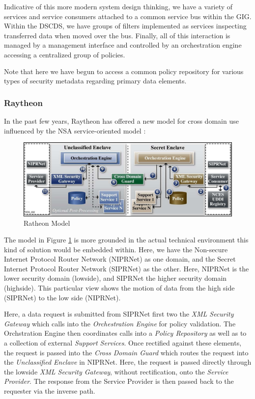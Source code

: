 \documentclass[12pt,letterpaper]{article}
\begin{document}
Indicative of this more modern system design thinking, we have a variety of services and service consumers attached to a common service bus within the GIG.  Within the DSCDS, we have groups of filters implemented as services inspecting transferred data when moved over the bus.  Finally, all of this interaction is managed by a management interface and controlled by an orchestration engine accessing a centralized group of policies.

Note that here we have begun to access a common policy repository for various types of security metadata regarding primary data elements.

\subsubsection{Raytheon}
In the past few years, Raytheon has offered a new model for cross domain use influenced by the NSA service-oriented model \cite{proposal:raytheon-arch}:

\begin{figure}[!t]
\centering
\includegraphics[width=5in]{raytheon-arch}
\caption{Ratheon Model}
\label{fig:model:conceptual-model-ray}
\end{figure}

The model in Figure \ref{fig:model:conceptual-model-ray}   is more grounded in the actual technical environment this kind of solution would be embedded within.  Here, we have the Non-secure Internet Protocol Router Network (NIPRNet) as one domain, and the Secret Internet Protocol Router Network (SIPRNet) as the other.  Here, NIPRNet is the lower security domain (lowside), and SIPRNet the higher security domain (highside).  This particular view shows the motion of data from the high side (SIPRNet) to the low side (NIPRNet).

Here, a data request is submitted from SIPRNet first two the \textit{XML Security Gateway} which calls into the \textit{Orchestration Engine} for policy validation.  The Orchstration Engine then coordinates calls into a \textit{Policy Repository} as well as to a collection of external \textit{Support Services}.  Once rectified against these elements, the request is passed into the \textit{Cross Domain Guard} which routes the request into the \textit{Unclassified Enclave} in NIPRNet.  Here, the request is passed directly through the lowside \textit{XML Security Gateway}, without rectification, onto the \textit{Service Provider}.  The response from the Service Provider is then passed back to the requester via the inverse path.
\end{document}
